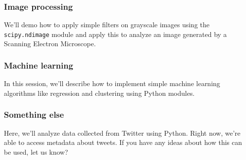 \documentclass{article}
\begin{document}
\subsubsection*{Image processing}
We'll demo how to apply simple filters on grayscale images using the
\texttt{scipy.ndimage} module and apply this to analyze an image generated by
a Scanning Electron Microscope.
\subsubsection*{Machine learning}
In this session, we'll describe how to implement simple machine learning algorithms
like regression and clustering using Python modules.
\subsubsection*{Something else}
Here, we'll analyze data collected from Twitter using Python. Right now, we're able
to access metadata about tweets. If you have any ideas about how this can be used,
let us know?
\end{document}
